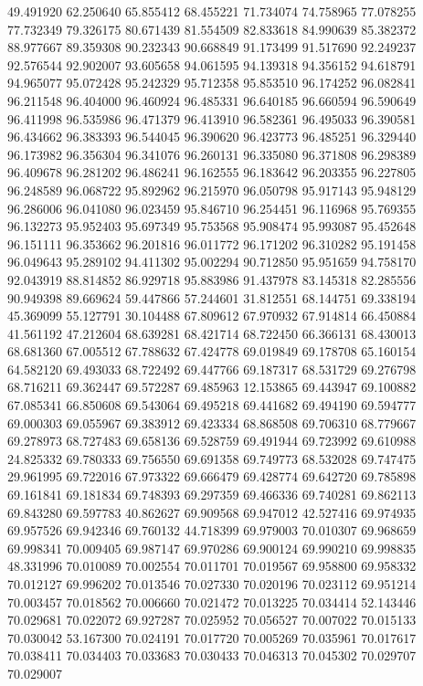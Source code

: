 49.491920
62.250640
65.855412
68.455221
71.734074
74.758965
77.078255
77.732349
79.326175
80.671439
81.554509
82.833618
84.990639
85.382372
88.977667
89.359308
90.232343
90.668849
91.173499
91.517690
92.249237
92.576544
92.902007
93.605658
94.061595
94.139318
94.356152
94.618791
94.965077
95.072428
95.242329
95.712358
95.853510
96.174252
96.082841
96.211548
96.404000
96.460924
96.485331
96.640185
96.660594
96.590649
96.411998
96.535986
96.471379
96.413910
96.582361
96.495033
96.390581
96.434662
96.383393
96.544045
96.390620
96.423773
96.485251
96.329440
96.173982
96.356304
96.341076
96.260131
96.335080
96.371808
96.298389
96.409678
96.281202
96.486241
96.162555
96.183642
96.203355
96.227805
96.248589
96.068722
95.892962
96.215970
96.050798
95.917143
95.948129
96.286006
96.041080
96.023459
95.846710
96.254451
96.116968
95.769355
96.132273
95.952403
95.697349
95.753568
95.908474
95.993087
95.452648
96.151111
96.353662
96.201816
96.011772
96.171202
96.310282
95.191458
96.049643
95.289102
94.411302
95.002294
90.712850
95.951659
94.758170
92.043919
88.814852
86.929718
95.883986
91.437978
83.145318
82.285556
90.949398
89.669624
59.447866
57.244601
31.812551
68.144751
69.338194
45.369099
55.127791
30.104488
67.809612
67.970932
67.914814
66.450884
41.561192
47.212604
68.639281
68.421714
68.722450
66.366131
68.430013
68.681360
67.005512
67.788632
67.424778
69.019849
69.178708
65.160154
64.582120
69.493033
68.722492
69.447766
69.187317
68.531729
69.276798
68.716211
69.362447
69.572287
69.485963
12.153865
69.443947
69.100882
67.085341
66.850608
69.543064
69.495218
69.441682
69.494190
69.594777
69.000303
69.055967
69.383912
69.423334
68.868508
69.706310
68.779667
69.278973
68.727483
69.658136
69.528759
69.491944
69.723992
69.610988
24.825332
69.780333
69.756550
69.691358
69.749773
68.532028
69.747475
29.961995
69.722016
67.973322
69.666479
69.428774
69.642720
69.785898
69.161841
69.181834
69.748393
69.297359
69.466336
69.740281
69.862113
69.843280
69.597783
40.862627
69.909568
69.947012
42.527416
69.974935
69.957526
69.942346
69.760132
44.718399
69.979003
70.010307
69.968659
69.998341
70.009405
69.987147
69.970286
69.900124
69.990210
69.998835
48.331996
70.010089
70.002554
70.011701
70.019567
69.958800
69.958332
70.012127
69.996202
70.013546
70.027330
70.020196
70.023112
69.951214
70.003457
70.018562
70.006660
70.021472
70.013225
70.034414
52.143446
70.029681
70.022072
69.927287
70.025952
70.056527
70.007022
70.015133
70.030042
53.167300
70.024191
70.017720
70.005269
70.035961
70.017617
70.038411
70.034403
70.033683
70.030433
70.046313
70.045302
70.029707
70.029007
